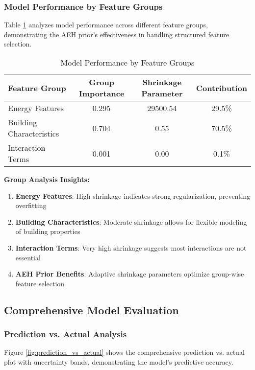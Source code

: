 \subsubsection{Model Performance by Feature Groups}

Table \ref{tab:group_performance} analyzes model performance across different feature groups, demonstrating the AEH prior's effectiveness in handling structured feature selection.

\begin{table}[h!]
\centering
\caption{Model Performance by Feature Groups}
\label{tab:group_performance}
\begin{tabular}{lccc}
\toprule
\textbf{Feature Group} & \textbf{Group Importance} & \textbf{Shrinkage Parameter} & \textbf{Contribution} \\
\midrule
Energy Features & 0.295 & 29500.54 & 29.5\% \\
Building Characteristics & 0.704 & 0.55 & 70.5\% \\
Interaction Terms & 0.001 & 0.00 & 0.1\% \\
\bottomrule
\end{tabular}
\end{table}

\textbf{Group Analysis Insights:}
\begin{enumerate}
    \item \textbf{Energy Features}: High shrinkage indicates strong regularization, preventing overfitting
    \item \textbf{Building Characteristics}: Moderate shrinkage allows for flexible modeling of building properties
    \item \textbf{Interaction Terms}: Very high shrinkage suggests most interactions are not essential
    \item \textbf{AEH Prior Benefits}: Adaptive shrinkage parameters optimize group-wise feature selection
\end{enumerate}

\subsection{Comprehensive Model Evaluation}

\subsubsection{Prediction vs. Actual Analysis}

Figure \ref{fig:prediction_vs_actual} shows the comprehensive prediction vs. actual plot with uncertainty bands, demonstrating the model's predictive accuracy.

